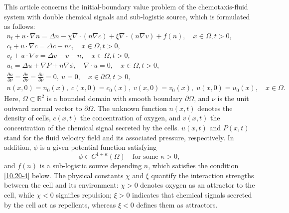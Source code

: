 \documentclass[reqno]{amsart}
\begin{document}
This article concerns the initial-boundary value problem of the chemotaxis-fluid system with double chemical signals and sub-logistic source, which is formulated as follows:
\begin{equation}\label{eq1.1}
\begin{gathered}
n_t + u \cdot \nabla n = \Delta n - \chi \nabla \cdot (n\nabla c)
+\xi \nabla \cdot (n\nabla v) + f(n), \quad x \in \Omega, t > 0, \\
c_t + u \cdot \nabla c = \Delta c - nc, \quad x \in \Omega, t > 0, \\
v_t + u \cdot \nabla v= \Delta v - v + n, \quad
 x \in \Omega, t > 0, \\
u_t  = \Delta u + \nabla P + n\nabla \phi, \quad \nabla \cdot u = 0, \quad
 x \in \Omega, t > 0, \\
\frac{\partial n}{\partial \nu}=\frac{\partial c}{\partial \nu}
= \frac{\partial v}{\partial \nu}= 0, \ u= 0, \quad x \in \partial\Omega, t >
0, \\
n(x, 0) = n_0(x), \; c(x, 0) = c_0(x), \; v(x, 0) = v_0(x), \; u(x, 0) = u_0(x), 
\quad  x \in \Omega.
\end{gathered}
\end{equation}
Here, $\Omega\subset \mathbb{R}^2$ is a bounded domain with smooth boundary 
$\partial\Omega$, and $\nu$ is the unit outward normal vector to $\partial\Omega$. 
The unknown function $n(x,t)$ denotes the density of cells, $c(x,t)$ the concentration 
of oxygen, and $v(x,t)$ the
concentration of the chemical signal secreted by the cells. 
$u(x,t)$ and $P(x,t)$ stand for  the fluid velocity field and its associated pressure,
respectively. In addition, $\phi$ is a given potential function satisfying
\begin{equation}\label{eq1.2}
\phi \in  C^{1 +\kappa}(\Omega) \quad\text{for some } \kappa> 0,
\end{equation}
and $f(n)$ is a sub-logistic source depending $n$, which satisfies the condition 
\eqref{10.20-4} below. The physical constants
$\chi$ and $\xi$ quantify the interaction strengths between the cell and its 
environment:
$\chi>0$ denotes oxygen as an attractor to the cell, while
$\chi<0$ signifies repulsion;
$\xi>0$ indicates that chemical signals secreted by the cell act as repellents, whereas
$\xi<0$ defines them as attractors.
\end{document}
